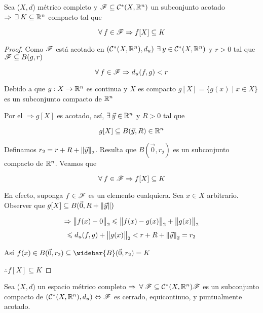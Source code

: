 \begin{lemma} \label{lemma523}
    Sea ($X,d$) métrico completo y $\mathscr{F} \subseteq {\ensuremath{\mathcal{C}}}^{\ast}(X,\mathbb{R}^n)$ un subconjunto acotado $\Rightarrow \: \exists \: K \subseteq \mathbb{R}^n$ compacto tal que

    $$\forall \: f \in \mathscr{F} \Rightarrow f[X] \subseteq K$$
\end{lemma}

\begin{proof}
     Como $\mathscr{F}$ está acotado en $({\mathcal{C}}^{\ast}(X,\mathbb{R}^n), d_{u})$ $\exists \: y \in {\ensuremath{\mathcal{C}}}^{\ast}(X,\mathbb{R}^n)$ y $r > 0$ tal que $\mathscr{F} \subseteq B(g,r)$

     $$\forall \: f \in \mathscr{F} \Rightarrow d_u(f,g) < r$$

     Debido a que $g : X \to \mathbb{R}^n$ es continua y $X$ es compacto $g[X] = \{ g(x) \mid x \in X \}$ es un subconjunto compacto de $\mathbb{R}^n$

     Por el  $\Rightarrow g[X]$ es acotado, así, $\exists \: \vec{y} \in \mathbb{R}^n$ y $R>0$ tal que

     $$g[X] \subseteq B(\vec{y},R) \in \mathbb{R}^n$$

     Definamos $r_2 = r + R + \norm{\vec{y}}_2$. Resulta que  $B(\vec{0},r_2)$ es un subconjunto compacto de $\mathbb{R}^n$. Veamos que 

     $$\forall \: f \in \mathscr{F} \Rightarrow f[X] \subseteq K$$

     En efecto, suponga $f \in \mathscr{F}$ es un elemento cualquiera. Sea $x \in X$ arbitrario. Observer que $g[X] \subseteq B(\vec{0}, R + \norm{\vec{y}})$

     $$\Rightarrow \norm{f(x)-0}_2 \leqslant \norm{f(x)-g(x)}_2 + \norm{g(x)}_2 $$
     $$\leqslant d_u(f,g) + \norm{g(x)}_2 < r + R + \norm{\vec{y}}_2 = r_2 $$

     Así $f(x) \in B(\vec{0},r_2) \subseteq \widebar{B}(\vec{0},r_2) = K$

     $\therefore f[X] \subseteq K$
\end{proof}

\begin{theorem} 
    Sea ($X,d$) un espacio métrico completo $\Rightarrow \: \forall \: \mathscr{F} \subseteq {\ensuremath{\mathcal{C}}}^{\ast}(X,\mathbb{R}^n) \mathscr{F}$ es un subconjunto compacto de $({\mathcal{C}}^{\ast}(X,\mathbb{R}^n), d_{u}) \Leftrightarrow \mathscr{F}$ es cerrado, equicontinuo, y puntualmente acotado.
\end{theorem}

